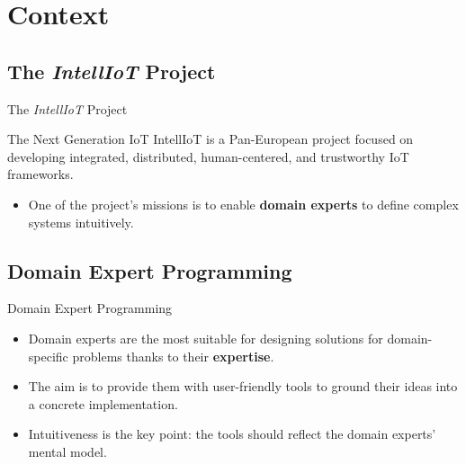 \section{Context}

\subsection{The \textit{IntellIoT} Project}

\begin{frame}{The \textit{IntellIoT} Project}
    \begin{block}{The Next Generation IoT}
        IntellIoT is a Pan-European project focused on developing integrated, distributed, human-centered, and trustworthy IoT frameworks.
    \end{block}

    \vspace{1cm}

    \begin{itemize}
        \item One of the project's missions is to enable \textbf{domain experts} to define complex systems intuitively.
    \end{itemize}
\end{frame}

\subsection{Domain Expert Programming}

\begin{frame}{Domain Expert Programming}
    \begin{itemize}
        \item Domain experts are the most suitable for designing solutions for domain-specific problems thanks to their \textbf{expertise}.
        \vspace{0.5cm}
        \item The aim is to provide them with user-friendly tools to ground their ideas into a concrete implementation.
        \vspace{0.5cm}
        \item Intuitiveness is the key point: the tools should reflect the domain experts' mental model.
    \end{itemize}
\end{frame}